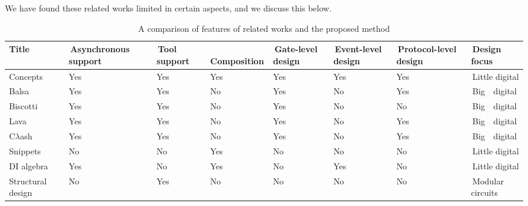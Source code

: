 \documentclass[british,compsoc]{IEEEtran}
\begin{document}
We have found these related works limited in
certain aspects, and we discuss this below.
\begin{table}[t]
\caption{A comparison of features of related works and the proposed method \label{tab:related_work}}
  \centering
  \begin{tabular}[htb]{| m{1.5cm} | m{2cm} | m{1.3cm} | m{1.75cm} | m{1.5cm} | m{1.5cm} | m{1.7cm} | m{1.15cm} |}
  \hline
  Title                       & \,Asynchronous support & \,Tool support  & \,Composition & \,Gate-level design & \,Event-level design & \,Protocol-level design  & \,Design focus \\ \hline \hline
  Concepts              & Yes                               & Yes                 & Yes               & Yes                       & Yes                         & Yes                              & \,Little digital \\ \hline
  Balsa                     & Yes                               & Yes                 & No                & Yes                       & No                          & Yes                              & \,Big\,\,\,\, digital \\ \hline
  Biscotti                  & Yes                               & Yes                 & No                & Yes                       & No                           & No                               & \,Big\,\,\,\, digital \\ \hline
  Lava                      & Yes                               & Yes                 & No                & Yes                       & No                           & Yes                             & \,Big\,\,\,\, digital \\ \hline
  C$\lambda$ash     & Yes                               & Yes                 & No                & Yes                       & No                           & Yes                             & \,Big\,\,\,\, digital \\ \hline
  Snippets                & No                                & No                   & Yes               & No                        & No                          & No                                & \,Little digital \\ \hline
  DI algebra             & Yes                               & No                   & Yes               & No                        & Yes                         & No                               & \,Little digital \\ \hline
  Structural design   & No                                & Yes                 & No                 & No                        & No                          & No                               & \,Modular circuits \\ \hline
  \end{tabular}
\end{table}
\end{document}
